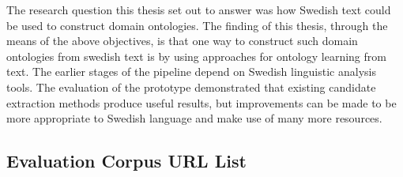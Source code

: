 \documentclass[a4paper]{report}
\begin{document}
The research question this thesis set out to answer was how Swedish text could be used to construct domain ontologies.
The finding of this thesis, through the means of the above objectives, is that one way to construct such domain ontologies from swedish text is by using approaches for ontology learning from text.
The earlier stages of the pipeline depend on Swedish linguistic analysis tools.
The evaluation of the prototype demonstrated that existing candidate extraction methods produce useful results, but improvements can be made to be more appropriate to Swedish language and make use of many more resources.

\begin{appendices}

\chapter{Evaluation Corpus URL List}
\label{chap:eval-corp-links}
\begin{footnotesize}


\end{footnotesize}
\end{appendices}
\end{document}

